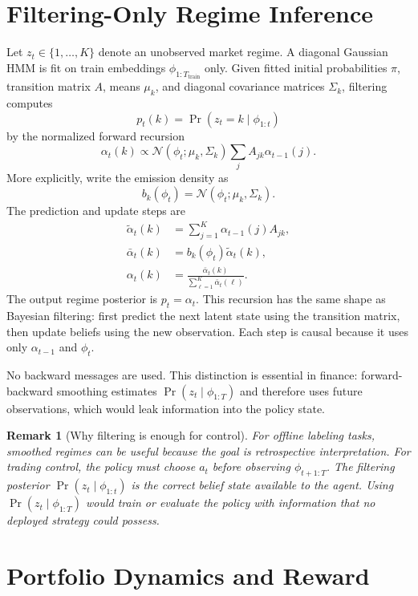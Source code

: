 \documentclass[11pt]{article}
\newtheorem{remark}{Remark}
\newcommand{\1}{\mathbf{1}}
\begin{document}
\section{Filtering-Only Regime Inference}

Let $z_t \in \{1,\ldots,K\}$ denote an unobserved market regime. A diagonal
Gaussian HMM is fit on train embeddings $\phi_{1:T_{\mathrm{train}}}$ only.
Given fitted initial probabilities $\pi$, transition matrix $A$, means
$\mu_k$, and diagonal covariance matrices $\Sigma_k$, filtering computes
\[
p_t(k) = \Pr(z_t=k \mid \phi_{1:t})
\]
by the normalized forward recursion
\[
\alpha_t(k) \propto
\mathcal{N}(\phi_t;\mu_k,\Sigma_k)
\sum_j A_{jk}\alpha_{t-1}(j).
\]
More explicitly, write the emission density as
\[
b_k(\phi_t)=\mathcal{N}(\phi_t;\mu_k,\Sigma_k).
\]
The prediction and update steps are
\begin{align}
\tilde{\alpha}_t(k) &= \sum_{j=1}^{K}\alpha_{t-1}(j)A_{jk},\\
\bar{\alpha}_t(k) &= b_k(\phi_t)\tilde{\alpha}_t(k),\\
\alpha_t(k) &= \frac{\bar{\alpha}_t(k)}
{\sum_{\ell=1}^{K}\bar{\alpha}_t(\ell)}.
\end{align}
The output regime posterior is $p_t=\alpha_t$. This recursion has the same
shape as Bayesian filtering: first predict the next latent state using the
transition matrix, then update beliefs using the new observation. Each step is
causal because it uses only $\alpha_{t-1}$ and $\phi_t$.

No backward messages are used. This distinction is essential in finance:
forward-backward smoothing estimates $\Pr(z_t \mid \phi_{1:T})$ and therefore
uses future observations, which would leak information into the policy state.

\begin{remark}[Why filtering is enough for control]
For offline labeling tasks, smoothed regimes can be useful because the goal is
retrospective interpretation. For trading control, the policy must choose
$a_t$ before observing $\phi_{t+1:T}$. The filtering posterior
$\Pr(z_t\mid \phi_{1:t})$ is the correct belief state available to the agent.
Using $\Pr(z_t\mid \phi_{1:T})$ would train or evaluate the policy with
information that no deployed strategy could possess.
\end{remark}

\section{Portfolio Dynamics and Reward}
\end{document}
